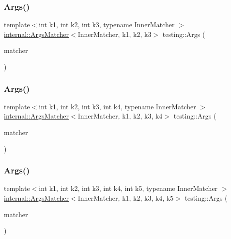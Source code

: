 \mbox{\label{namespacetesting_abd3ddae153e1c452b7625808cc4d820b}} 
\subsubsection{\texorpdfstring{Args()}{Args()}\hspace{0.1cm}{\footnotesize\ttfamily [4/11]}}
{\footnotesize\ttfamily template$<$int k1, int k2, int k3, typename Inner\+Matcher $>$ \\
\mbox{\hyperlink{classtesting_1_1internal_1_1_args_matcher}{internal\+::\+Args\+Matcher}}$<$Inner\+Matcher, k1, k2, k3$>$ testing\+::\+Args (\begin{DoxyParamCaption}\item[{const Inner\+Matcher \&}]{matcher }\end{DoxyParamCaption})\hspace{0.3cm}{\ttfamily [inline]}}

\mbox{\label{namespacetesting_aeff7e644fd00516c3519fe8c0dc1aee2}} 
\subsubsection{\texorpdfstring{Args()}{Args()}\hspace{0.1cm}{\footnotesize\ttfamily [5/11]}}
{\footnotesize\ttfamily template$<$int k1, int k2, int k3, int k4, typename Inner\+Matcher $>$ \\
\mbox{\hyperlink{classtesting_1_1internal_1_1_args_matcher}{internal\+::\+Args\+Matcher}}$<$Inner\+Matcher, k1, k2, k3, k4$>$ testing\+::\+Args (\begin{DoxyParamCaption}\item[{const Inner\+Matcher \&}]{matcher }\end{DoxyParamCaption})\hspace{0.3cm}{\ttfamily [inline]}}

\mbox{\label{namespacetesting_aede9fd33cce0d21f5e31ba10a0706827}} 
\subsubsection{\texorpdfstring{Args()}{Args()}\hspace{0.1cm}{\footnotesize\ttfamily [6/11]}}
{\footnotesize\ttfamily template$<$int k1, int k2, int k3, int k4, int k5, typename Inner\+Matcher $>$ \\
\mbox{\hyperlink{classtesting_1_1internal_1_1_args_matcher}{internal\+::\+Args\+Matcher}}$<$Inner\+Matcher, k1, k2, k3, k4, k5$>$ testing\+::\+Args (\begin{DoxyParamCaption}\item[{const Inner\+Matcher \&}]{matcher }\end{DoxyParamCaption})\hspace{0.3cm}{\ttfamily [inline]}}

